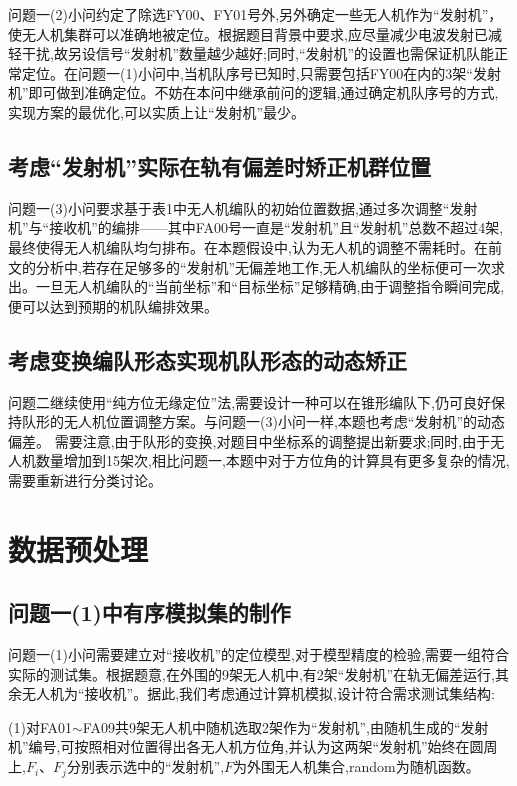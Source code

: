 \documentclass[withoutpreface,bwprint]{cumcmthesis} %
\begin{document}
		问题一(2)小问约定了除选FY00、FY01号外,另外确定一些无人机作为“发射机”，使无人机集群可以准确地被定位。根据题目背景中要求,应尽量减少电波发射已减轻干扰,故另设信号“发射机”数量越少越好;同时,“发射机”的设置也需保证机队能正常定位。在问题一(1)小问中,当机队序号已知时,只需要包括FY00在内的3架“发射机”即可做到准确定位。不妨在本问中继承前问的逻辑,通过确定机队序号的方式,实现方案的最优化,可以实质上让“发射机”最少。
	
	\subsection{考虑“发射机”实际在轨有偏差时矫正机群位置}
		
		问题一(3)小问要求基于表1中无人机编队的初始位置数据,通过多次调整“发射机”与“接收机”的编排——其中FA00号一直是“发射机”且“发射机”总数不超过4架,最终使得无人机编队均匀排布。在本题假设中,认为无人机的调整不需耗时。在前文的分析中,若存在足够多的“发射机”无偏差地工作,无人机编队的坐标便可一次求出。一旦无人机编队的“当前坐标”和“目标坐标”足够精确,由于调整指令瞬间完成,便可以达到预期的机队编排效果。
		
	
	\subsection{考虑变换编队形态实现机队形态的动态矫正}
		
		问题二继续使用“纯方位无缘定位”法,需要设计一种可以在锥形编队下,仍可良好保持队形的无人机位置调整方案。与问题一(3)小问一样,本题也考虑“发射机”的动态偏差。%
		需要注意,由于队形的变换,对题目中坐标系的调整提出新要求;同时,由于无人机数量增加到15架次,相比问题一,本题中对于方位角的计算具有更多复杂的情况,需要重新进行分类讨论。
	
		 
	\section{数据预处理}
	\subsection{问题一(1)中有序模拟集的制作}
		
			问题一(1)小问需要建立对“接收机”的定位模型,对于模型精度的检验,需要一组符合实际的测试集。根据题意,在外围的9架无人机中,有2架“发射机”在轨无偏差运行,其余无人机为“接收机”。据此,我们考虑通过计算机模拟,设计符合需求测试集结构:
			
			(1)对FA01$\sim$FA09共9架无人机中随机选取2架作为“发射机”,由随机生成的“发射机”编号,可按照相对位置得出各无人机方位角,并认为这两架“发射机”始终在圆周上,$F_{i}$、$F_{j}$分别表示选中的“发射机”,$F$为外围无人机集合,random为随机函数。
				
\end{document}
